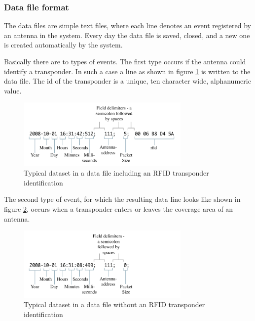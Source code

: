 \subsubsection{Data file format}
\label{subsubsec:datafileformat}
The data files are simple text files, where each line denotes an event registered by an antenna in the system. Every day the data file is saved, closed, and a new one is created automatically by the system.

Basically there are to types of events. The first type occurs if the antenna could identify a transponder. In such a case a line as shown in figure \ref{fig:dataset} is written to the data file. The id of the transponder is a unique, ten character wide, alphanumeric value.

\begin{figure}[htbp]	
\centering	
\includegraphics[width=0.75\textwidth]{assets/pdf/dataset.pdf}	
\caption[Dataset including an RFID transponder identification]{Typical dataset in a data file including an \ac{RFID} transponder identification}
\label{fig:dataset}
\end{figure}

The second type of event, for which the resulting data line looks like shown in figure \ref{fig:dataset_no_data}, occurs when a transponder enters or leaves the coverage area of an antenna.

\begin{figure}[htbp]	
\centering	
\includegraphics[width=0.75\textwidth]{assets/pdf/dataset_no_data.pdf}	
\caption[Dataset without RFID transponder identification]{Typical dataset in a data file without an \ac{RFID} transponder identification}
\label{fig:dataset_no_data}
\end{figure}

